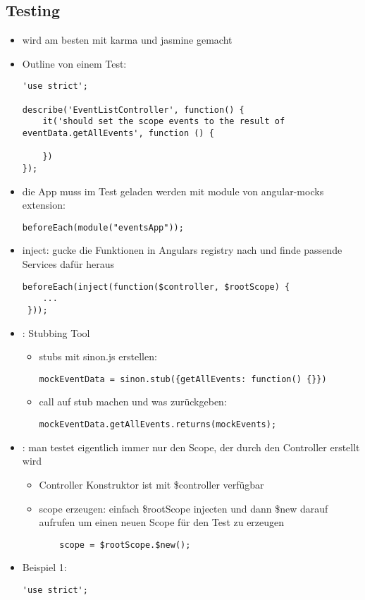 \subsection{Testing}
\begin{itemize}
  \item wird am besten mit karma und jasmine gemacht
  \item Outline von einem Test:
    \begin{verbatim}
'use strict';

describe('EventListController', function() {
    it('should set the scope events to the result of eventData.getAllEvents', function () {

    })
});
    \end{verbatim}
  \item die App muss im Test geladen werden mit module von angular-mocks extension:
    \begin{verbatim}
beforeEach(module("eventsApp"));
    \end{verbatim}
  \item inject: gucke die Funktionen in Angulars registry nach und finde passende Services dafür heraus
    \begin{verbatim}
beforeEach(inject(function($controller, $rootScope) {
    ...
 }));
    \end{verbatim}
  \item {}: Stubbing Tool
    \begin{itemize}
      \item stubs mit sinon.js erstellen:
        \begin{verbatim}
mockEventData = sinon.stub({getAllEvents: function() {}})
        \end{verbatim}
      \item call auf stub machen und was zurückgeben:
        \begin{verbatim}
mockEventData.getAllEvents.returns(mockEvents);
        \end{verbatim}
    \end{itemize}
  \item {}: man testet eigentlich immer nur den Scope, der durch den
    Controller erstellt wird
    \begin{itemize}
      \item Controller Konstruktor ist mit \$controller verfügbar
      \item scope erzeugen: einfach \$rootScope injecten und dann \$new darauf aufrufen um einen neuen
        Scope für den Test zu erzeugen
        \begin{verbatim}
    scope = $rootScope.$new();
        \end{verbatim}
    \end{itemize}
  \item Beispiel 1:
    \begin{verbatim}
'use strict';


\end{verbatim}
\end{itemize}
